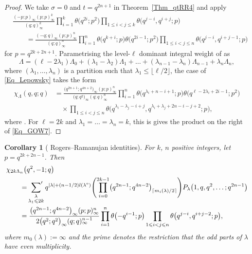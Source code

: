 \documentclass[pdftex]{sigma}
\numberwithin{equation}{section}
\newtheorem{Corollary}[Theorem]{Corollary}
\renewcommand{\leq}{\leqslant}
\newcommand{\ceil}[1]{\lceil#1\rceil}
\newcommand{\floor}[1]{\lfloor#1\rfloor}
\newcommand{\abs}[1]{\vert#1\vert}
\newcommand{\la}{\lambda}
\newcommand{\La}{\Lambda}
\begin{document}
\begin{proof}
We take $\sigma=0$ and $t=q^{2n+1}$ in Theorem~\ref{Thm_qtRR4} and apply
\begin{align*}
&\frac{(-p;p)_{\infty}(p;p)_{\infty}^k}{(q;q)_{\infty}^k}
\prod_{i=1}^k \theta\bigl(q^{2i};p^2\bigr)
\prod_{1\leq i<j\leq k}\theta\bigl(q^{j-i},q^{i+j};p\bigr) \\
&\qquad=\frac{(-q;q)_{\infty}(p;p)_{\infty}^n}
{(q;q)_{\infty}^n}
\prod_{i=1}^n \theta\bigl(q^{k+i};p\bigr)\theta\bigl(q^{2i-1};p^2\bigr)
\prod_{1\leq i<j\leq n}\theta\bigl(q^{j-i},q^{i+j-1};p\bigr)
\end{align*}
for $p=q^{2k+2n+1}$.
Parametrising the level-$\ell$ dominant integral weight of
 as
\[
\La=(\ell-2\la_1)\La_0+(\la_1-\la_2)\La_1+\dots+
(\la_{n-1}-\la_n)\La_{n-1}+\la_n\La_n,
\]
where $(\la_1,\dots,\la_n)$ is a partition such that
$\la_1\leq\floor{\ell/2}$, the  case
of \eqref{Eq_Lepowsky} takes the form
\begin{align*}
\chi_{\La}(q,q;q)
&=\frac{\bigl(q^{2n+1};q^{4n+2}\bigr)_{\infty}(p;p)_{\infty}^n}
{\bigl(q;q^2\bigr)_{\infty}(q;q)_{\infty}^n}
\prod_{i=1}^n \theta\bigl(q^{\la_i+n-i+1};p\bigr)
\theta\bigl(q^{\ell-2\la_i+2i-1};p^2\bigr) \\
&\quad\times\prod_{1\leq i<j\leq n}
\theta\bigl(q^{\la_i-\la_j-i+j},q^{\la_i+\la_j+2n-i-j+2};p\bigr),
\end{align*}
where .
For $\ell=2k$ and $\la_1=\dots=\la_n=k$, this is gives
the product on the right of \eqref{Eq_GOW7}.
\end{proof}

\begin{Corollary}[ Rogers--Ramanujan identities]
\label{Cor_16}
For $k$, $n$ positive integers, let $p\!=\!q^{2k+2n-1}$.
Then
\begin{align}
&\chi_{2k\La_n}\bigl(q^2,-1;q\bigr) \notag\\
&\qquad{}=\sideset{}{'}\sum_{\substack{\la \\[1pt] \la_1\leq 2k}}
q^{\abs{\la}+(n-1/2)l(\la^{\textup{o}})}
\Biggl(\prod_{i=0}^{2k-1}
\bigl(q^{2n-1};q^{4n-2}\bigr)_{\ceil{m_i(\la)/2}}\Biggr)
P_{\la}\bigl(1,q,q^2,\dots;q^{2n-1}\bigr) \notag \\
&\qquad{}=\frac{\bigl(q^{2n-1};q^{4n-2}\bigr)_{\infty}(p;p)_{\infty}^n}
{2\bigl(q^2;q^2\bigr)_{\infty}(q;q)_{\infty}^{n-1}}
\prod_{i=1}^n \theta\bigl({-}q^{i-1};p\bigr)
\prod_{1\leq i<j\leq n}\theta\bigl(q^{j-i},q^{i+j-2};p\bigr),
\label{Eq_GOW9}
\end{align}
where $m_0(\la):=\infty$ and the prime denotes the restriction that
the odd parts of $\la$ have even multiplicity.
\end{Corollary}
\end{document}
